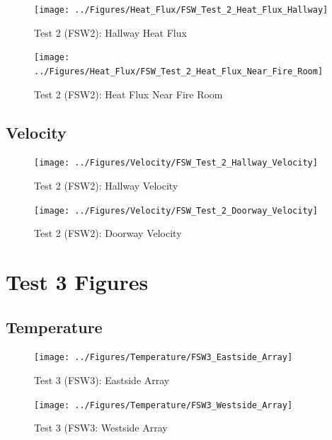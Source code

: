 \documentclass[12pt,oneside]{book}
\begin{document}
\begin{figure}[!ht]
	\texttt{[image: ../Figures/Heat\_Flux/FSW\_Test\_2\_Heat\_Flux\_Hallway]}
	\caption{Test 2 (FSW2): Hallway Heat Flux}
	\label{fig:Test_2_Hallway_Heat_Flux}
\end{figure}

\begin{figure}[!ht]
	\texttt{[image: ../Figures/Heat\_Flux/FSW\_Test\_2\_Heat\_Flux\_Near\_Fire\_Room]}
	\caption{Test 2 (FSW2): Heat Flux Near Fire Room}
	\label{fig:Test_2_Heat_Flux_Near_Fire_Room}
\end{figure}

\subsection{Velocity}
\label{subsec:Velocity}

\begin{figure}[!ht]
	\texttt{[image: ../Figures/Velocity/FSW\_Test\_2\_Hallway\_Velocity]}
	\caption{Test 2 (FSW2): Hallway Velocity}
	\label{fig:Test_2_Hallway_Velocity}
\end{figure}

\begin{figure}[!ht]
	\texttt{[image: ../Figures/Velocity/FSW\_Test\_2\_Doorway\_Velocity]}
	\caption{Test 2 (FSW2): Doorway Velocity}
	\label{fig:Test_2_Doorway_Velocity}
\end{figure}

\clearpage

\section{Test 3 Figures}
\label{subsec:Test_3_Figures}

\subsection{Temperature}
\label{subsec:Temperature}

\begin{figure}[!ht]
	\texttt{[image: ../Figures/Temperature/FSW3\_Eastside\_Array]}
	\caption{Test 3 (FSW3): Eastside Array}
	\label{fig:Test_3_Eastside_Array}
\end{figure}

\begin{figure}[!ht]
	\texttt{[image: ../Figures/Temperature/FSW3\_Westside\_Array]}
	\caption{Test 3 (FSW3: Westside Array}
	\label{fig:Test_3_Westside_Array}
\end{figure}
\end{document}
